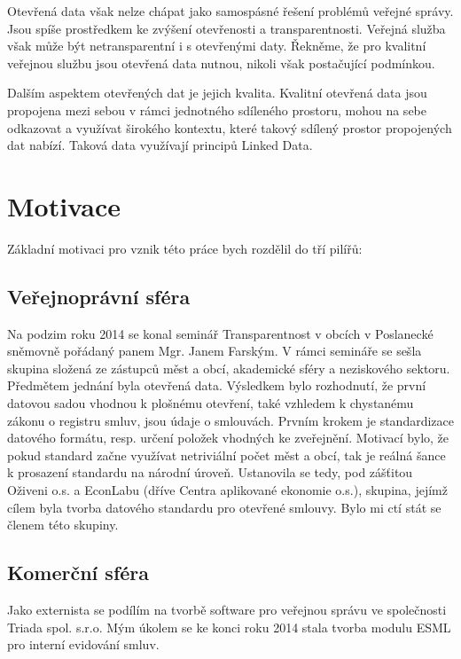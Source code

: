 Otevřená data však nelze chápat jako samospásné řešení problémů veřejné správy. Jsou spíše prostředkem ke zvýšení otevřenosti a transparentnosti. Veřejná služba však může být netransparentní i s otevřenými daty. Řekněme, že pro kvalitní veřejnou službu jsou otevřená data nutnou, nikoli však postačující podmínkou.

Dalším aspektem otevřených dat je jejich kvalita. Kvalitní otevřená data jsou propojena mezi sebou v rámci jednotného sdíleného prostoru, mohou na sebe odkazovat a využívat širokého kontextu, které takový sdílený prostor propojených dat nabízí. Taková data využívají principů Linked Data.

\section{Motivace}

Základní motivaci pro vznik této práce bych rozdělil do tří pilířů:

\subsection*{Veřejnoprávní sféra}

Na podzim roku 2014 se konal seminář Transparentnost v obcích v Poslanecké sněmovně pořádaný panem Mgr. Janem Farským. V rámci semináře se sešla skupina složená ze zástupců měst a obcí, akademické sféry a neziskového sektoru. Předmětem jednání byla otevřená data. Výsledkem bylo rozhodnutí, že první datovou sadou vhodnou k plošnému otevření, také vzhledem k chystanému zákonu o registru smluv, jsou údaje o smlouvách. Prvním krokem je standardizace datového formátu, resp. určení položek vhodných ke zveřejnění. Motivací bylo, že pokud standard začne využívat netriviální počet měst a obcí, tak je reálná šance k prosazení standardu na národní úroveň. Ustanovila se tedy, pod zášťitou Oživeni o.s. a EconLabu (dříve Centra aplikované ekonomie o.s.)\cite{econLab},  skupina, jejímž cílem byla tvorba datového standardu pro otevřené smlouvy. Bylo mi ctí stát se členem této skupiny.

\subsection*{Komerční sféra}

Jako externista se podílím na tvorbě software pro veřejnou správu ve společnosti Triada spol. s.r.o. Mým úkolem se ke konci roku 2014 stala tvorba modulu ESML pro interní evidování smluv.


